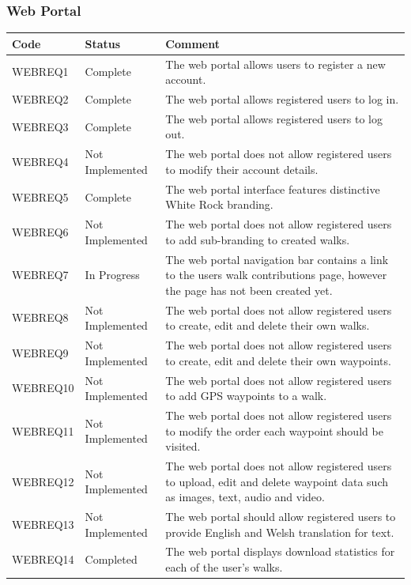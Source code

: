 \documentclass[11pt,a4paper]{article}
\begin{document}
\subsubsection{Web Portal}

\begin{longtable}{ p{}|p{}|p{} }
\textbf{Code} & \textbf{Status} & \textbf{Comment} \\
\hline
WEBREQ1 & Complete & The web portal allows users to register a new account. \\ \hline
WEBREQ2 & Complete & The web portal allows registered users to log in. \\ \hline
WEBREQ3 & Complete & The web portal allows registered users to log out. \\ \hline
WEBREQ4 & Not Implemented & The web portal does not allow registered users to modify their account details. \\ \hline
WEBREQ5 & Complete & The web portal interface features distinctive White Rock branding. \\ \hline
WEBREQ6 & Not Implemented & The web portal does not allow registered users to add sub-branding to created walks. \\ \hline
WEBREQ7 & In Progress & The web portal navigation bar contains a link to the users walk contributions page, however the page has not been created yet. \\ \hline
WEBREQ8 & Not Implemented & The web portal does not allow registered users to create, edit and delete their own walks. \\ \hline
WEBREQ9 & Not Implemented & The web portal does not allow registered users to create, edit and delete their own waypoints. \\ \hline
WEBREQ10 & Not Implemented & The web portal does not allow registered users to add GPS waypoints to a walk. \\ \hline
WEBREQ11 & Not Implemented & The web portal does not allow registered users to modify the order each waypoint should be visited. \\ \hline
WEBREQ12 & Not Implemented & The web portal does not allow registered users to upload, edit and delete waypoint data such as images, text, audio and video. \\ \hline
WEBREQ13 & Not Implemented & The web portal should allow registered users to provide English and Welsh translation for text. \\ \hline
WEBREQ14 & Completed & The web portal displays download statistics for each of the user's walks. \\ \hline

\end{longtable}
\end{document}
